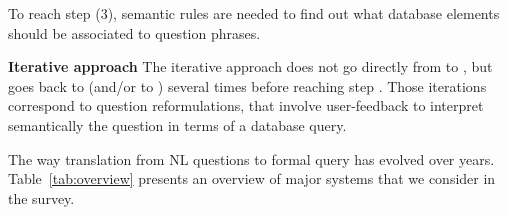 \documentclass[10pt,journal,letterpaper,compsoc]{IEEEtran}
\begin{document}
To reach step (3), semantic rules are needed to find out what database elements
should be associated to question phrases. 

\textbf{Iterative approach}
The iterative approach does not go directly from
 to
, but goes back to
 (and/or to
) several times before
reaching step .
Those iterations correspond to question reformulations, that involve
user-feedback to interpret semantically the question in terms of a database
query.


The way translation from NL questions to formal query has evolved over years.
Table~\ref{tab:overview} presents an overview of major systems that we consider
in the survey.
\end{document}
